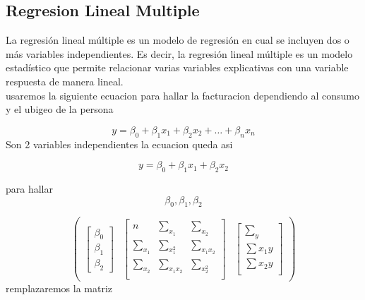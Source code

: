 \documentclass{article}
\begin{document}
\subsection{Regresion Lineal Multiple}
La regresión lineal múltiple es un modelo de regresión en cual se incluyen dos o más variables independientes. Es decir, la regresión lineal múltiple es un modelo estadístico que permite relacionar varias variables explicativas con una variable respuesta de manera lineal.
\\

usaremos la siguiente ecuacion para hallar la facturacion dependiendo al consumo y el ubigeo de la persona

\[ y = \beta_0 + \beta_1x_1 + \beta_2x_2 + \ldots + \beta_nx_n \]
Son 2 variables independientes la ecuacion queda asi

\[ y = \beta_0 + \beta_1x_1 + \beta_2x_2  \]

para hallar
\[ \beta_0, \beta_1, \beta_2 \]

\[
\begin{pmatrix}
\begin{bmatrix}
  \beta_0 \\
  \beta_1 \\
  \beta_2
\end{bmatrix}
&
\begin{bmatrix}
n & \sum_{x_{1}} & \sum_{x_{2}} \\
\sum_{x_{1}} & \sum_{x_{1}^{2}} & \sum_{x_{1}x_{2}}\\
\sum_{x_{2}} & \sum_{x_{1}x_{2}} & \sum_{x_{2}^{2}} \\
\end{bmatrix}
&
\begin{bmatrix}
\sum_y \\
\sum{x_{1}y} \\ 
\sum{x_{2}y} \\ 
\end{bmatrix}
\end{pmatrix}
\]
remplazaremos la matriz
\end{document}
